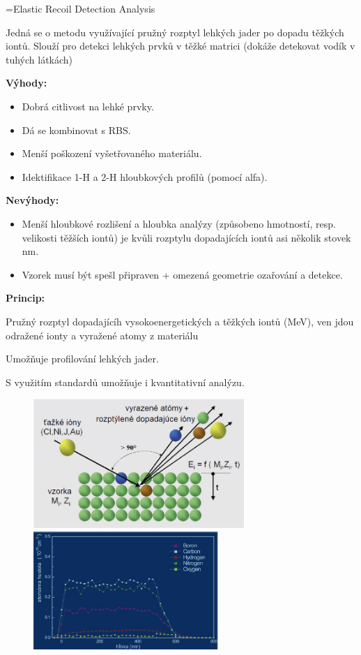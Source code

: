 =Elastic Recoil Detection Analysis

Jedná se o metodu využívající pružný rozptyl lehkých jader po dopadu těžkých iontů. Slouží pro detekci lehkých prvků v těžké matrici (dokáže detekovat vodík v tuhých látkách)

\textbf{Výhody:}

\begin{itemize}
    \item Dobrá citlivost na lehké prvky.
    \item Dá se kombinovat s RBS.
    \item Menší poškození vyšetřovaného materiálu.
    \item Idektifikace 1-H a 2-H hloubkových profilů (pomocí alfa).
\end{itemize}

\textbf{Nevýhody:}

\begin{itemize}
    \item Menší hloubkové rozlišení a hloubka analýzy (způsobeno hmotností, resp. velikosti těžších iontů) je kvůli rozptylu dopadajících iontů asi několik stovek nm.
    \item Vzorek musí být spešl připraven + omezená geometrie ozařování a detekce.
\end{itemize}

\textbf{Princip:}

Pružný rozptyl dopadajícíh vysokoenergetických a těžkých iontů (MeV), ven jdou odražené ionty a vyražené atomy z materiálu

Umožňuje profilování lehkých jader.

S využitím standardů umožňuje i kvantitativní analýzu.

\begin{figure}[H]
    \centering
	\includegraphics[width=8cm]{img/erda.png}
	\includegraphics[width=7cm]{img/erda-spektrum.png}
\end{figure}


